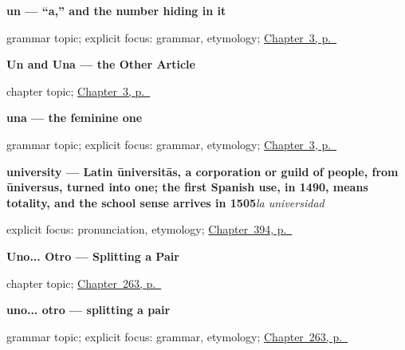 \noindent\begin{minipage}[t]{\linewidth}
\raggedright
\textbf{un — \textquotedblleft{}a,\textquotedblright{} and the number hiding in it}\par
\footnotesize grammar topic; explicit focus: grammar, etymology; \hyperref[ch:spanish-indefinite-article]{Chapter~3, p.~\pageref*{ch:spanish-indefinite-article}}
\end{minipage}\par\smallskip

\noindent\begin{minipage}[t]{\linewidth}
\raggedright
\textbf{Un and Una --- the Other Article}\par
\footnotesize chapter topic; \hyperref[ch:spanish-indefinite-article]{Chapter~3, p.~\pageref*{ch:spanish-indefinite-article}}
\end{minipage}\par\smallskip

\noindent\begin{minipage}[t]{\linewidth}
\raggedright
\textbf{una — the feminine one}\par
\footnotesize grammar topic; explicit focus: grammar, etymology; \hyperref[ch:spanish-indefinite-article]{Chapter~3, p.~\pageref*{ch:spanish-indefinite-article}}
\end{minipage}\par\smallskip

\noindent\begin{minipage}[t]{\linewidth}
\raggedright
\textbf{university — Latin ūniversitās, a corporation or guild of people, from ūniversus, turned into one; the first Spanish use, in 1490, means totality, and the school sense arrives in 1505}\enspace\emph{la universidad}\par
\footnotesize explicit focus: pronunciation, etymology; \hyperref[ch:la-universidad-y-el-trabajo]{Chapter~394, p.~\pageref*{ch:la-universidad-y-el-trabajo}}
\end{minipage}\par\smallskip

\noindent\begin{minipage}[t]{\linewidth}
\raggedright
\textbf{Uno... Otro --- Splitting a Pair}\par
\footnotesize chapter topic; \hyperref[ch:uno-otro]{Chapter~263, p.~\pageref*{ch:uno-otro}}
\end{minipage}\par\smallskip

\noindent\begin{minipage}[t]{\linewidth}
\raggedright
\textbf{uno... otro — splitting a pair}\par
\footnotesize grammar topic; explicit focus: grammar, etymology; \hyperref[ch:uno-otro]{Chapter~263, p.~\pageref*{ch:uno-otro}}
\end{minipage}\par\smallskip

